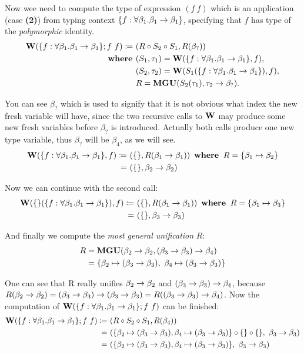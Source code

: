 \documentclass[a4paper,oneside]{memoir}
\begin{document}
Now wee need to compute the type of expression $(f~f)$ which is an application (case \textbf{(2)}) from typing context $\{f:\forall \beta_1 . \beta_1 \rightarrow \beta_1 \}$, specifying that $f$ has type of the \textit{polymorphic} identity. 
\begin{align*}
\operatorname{\textbf{W}}(\{f:\forall \beta_1 . \beta_1 \rightarrow \beta_1 \}; f~f) \coloneqq ~ & 
(R \circ S_2 \circ S_1, R(\beta_?) ) \\
\operatorname{\textbf{where~}} & (S_1, \tau_1) = \operatorname{\textbf{W}}(\{f:\forall \beta_1 . \beta_1 \rightarrow \beta_1 \}, f), \\
       & (S_2, \tau_2) = \operatorname{\textbf{W}}(S_1(\{f:\forall \beta_1 . \beta_1 \rightarrow \beta_1 \}), f), \\
       & R = \operatorname{\textbf{MGU}}( S_2(\tau_1), \tau_2 \rightarrow \beta_? ).\\
\end{align*}

You can see $\beta_?$ which is used to signify that it is not obvious what index the new fresh variable will have, since the two recursive calls to $\operatorname{\textbf{W}}$ may produce some new fresh variables before $\beta_?$ is introduced. Actually both calls produce one new type variable, thus $\beta_?$ will be $\beta_4$, as we will see.
\begin{align*}
\operatorname{\textbf{W}}(\{f:\forall \beta_1 . \beta_1 \rightarrow \beta_1 \}, f) \coloneqq ~ & (\{\}, R(\beta_1 \rightarrow \beta_1) ) 
~ \operatorname{\textbf{where~}} R = \{\beta_1 \mapsto \beta_2\} \\
= ~ &  (\{\}, \beta_2 \rightarrow \beta_2)
\end{align*}

Now we can continue with the second call:
\begin{align*}
\operatorname{\textbf{W}}(\{\}(\{f:\forall \beta_1 . \beta_1 \rightarrow \beta_1 \}), f) \coloneqq ~ & (\{\}, R(\beta_1 \rightarrow \beta_1) ) 
~ \operatorname{\textbf{where~}} R = \{\beta_1 \mapsto \beta_3\} \\
= ~ &  (\{\}, \beta_3 \rightarrow \beta_3)
\end{align*}

And finally we compute the \textit{most general unification} $R$:
\begin{align*}
R & = \operatorname{\textbf{MGU}}(\beta_2 \rightarrow \beta_2, (\beta_3 \rightarrow \beta_3) \rightarrow \beta_4 ) \\
  & = \{ \beta_2 \mapsto (\beta_3 \rightarrow \beta_3),~ \beta_4 \mapsto (\beta_3 \rightarrow \beta_3) \}
\end{align*}

One can see that R really unifies $\beta_2 \rightarrow \beta_2$ and $(\beta_3 \rightarrow \beta_3) \rightarrow \beta_4$,
because $R(\beta_2 \rightarrow \beta_2) = (\beta_3 \rightarrow \beta_3) \rightarrow (\beta_3 \rightarrow \beta_3) = R((\beta_3 \rightarrow \beta_3) \rightarrow \beta_4)$. Now the computation of $\operatorname{\textbf{W}}(\{f:\forall \beta_1 . \beta_1 \rightarrow \beta_1 \}; f~f)$ can be finished:
\begin{align*}
\operatorname{\textbf{W}}(\{f:\forall \beta_1 . \beta_1 \rightarrow \beta_1 \}; f~f) 
\coloneqq ~ & (R \circ S_2 \circ S_1, R(\beta_4) ) \\
    = ~ & (\{ \beta_2 \mapsto (\beta_3 \rightarrow \beta_3), \beta_4 \mapsto (\beta_3 \rightarrow \beta_3) \} \circ \{\} \circ \{\},~ \beta_3 \rightarrow \beta_3 )\\ 
    = ~ & (\{ \beta_2 \mapsto (\beta_3 \rightarrow \beta_3), \beta_4 \mapsto (\beta_3 \rightarrow \beta_3) \}, ~ \beta_3 \rightarrow \beta_3 ) 
\end{align*}
\end{document}
